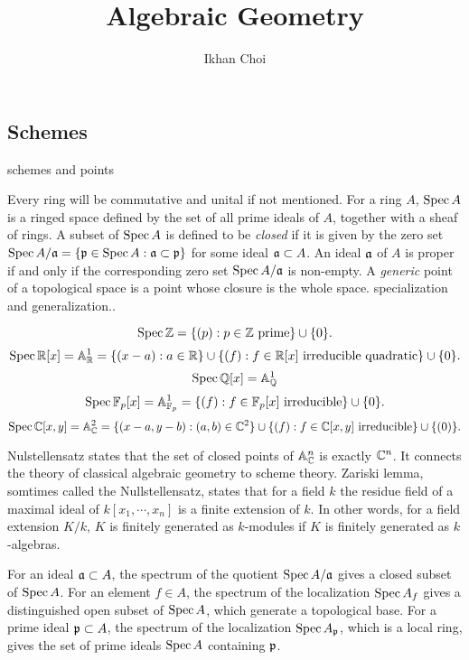 \documentclass{../../large}
\begin{document}
\title{Algebraic Geometry}
\author{Ikhan Choi}
\maketitle
\tableofcontents

\part{}


\chapter{Schemes}

\begin{prb}
schemes and points
\end{prb}
Every ring will be commutative and unital if not mentioned.
For a ring $A$, $\operatorname{Spec} A$ is a ringed space defined by the set of all prime ideals of $A$, together with a sheaf of rings.
A subset of $\operatorname{Spec} A$ is defined to be \emph{closed} if it is given by the zero set $\operatorname{Spec} A/\mathfrak{a}=\{\mathfrak{p}\in\operatorname{Spec} A:\mathfrak{a}\subset\mathfrak{p}\}$ for some ideal $\mathfrak{a}\subset A$.
An ideal $\mathfrak{a}$ of $A$ is proper if and only if the corresponding zero set $\operatorname{Spec} A/\mathfrak{a}$ is non-empty.
A \emph{generic} point of a topological space is a point whose closure is the whole space.
specialization and generalization..

\[\operatorname{Spec}\mathbb{Z}=\{(p):p\in\mathbb{Z}\text{ prime}\}\cup\{0\}.\]
\[\operatorname{Spec}\mathbb{R}[x]=\mathbb{A}^1_{\mathbb{R}}=\{(x-a):a\in\mathbb{R}\}\cup\{(f):f\in\mathbb{R}[x]\text{ irreducible quadratic}\}\cup\{0\}.\]
\[\operatorname{Spec}\mathbb{Q}[x]=\mathbb{A}^1_{\mathbb{Q}}\]
\[\operatorname{Spec}\mathbb{F}_p[x]=\mathbb{A}^1_{\mathbb{F}_p}=\{(f):f\in\mathbb{F}_p[x]\text{ irreducible}\}\cup\{0\}.\]
\[\operatorname{Spec}\mathbb{C}[x,y]=\mathbb{A}^2_{\mathbb{C}}=\{(x-a,y-b):(a,b)\in\mathbb{C}^2\}\cup\{(f):f\in\mathbb{C}[x,y]\text{ irreducible}\}\cup\{(0)\}.\]

Nulstellensatz states that the set of closed points of $\mathbb{A}^n_{\mathbb{C}}$ is exactly $\mathbb{C}^n$.
It connects the theory of classical algebraic geometry to scheme theory.
Zariski lemma, somtimes called the Nullstellensatz, states that for a field $k$ the residue field of a maximal ideal of $k[x_1,\cdots,x_n]$ is a finite extension of $k$.
In other words, for a field extension $K/k$, $K$ is finitely generated as $k$-modules if $K$ is finitely generated as $k$-algebras.


\begin{prb}
\end{prb}

For an ideal $\mathfrak{a}\subset A$, the spectrum of the quotient $\operatorname{Spec} A/\mathfrak{a}$ gives a closed subset of $\operatorname{Spec} A$.
For an element $f\in A$, the spectrum of the localization $\operatorname{Spec} A_f$ gives a distinguished open subset of $\operatorname{Spec} A$, which generate a topological base.
For a prime ideal $\mathfrak{p}\subset A$, the spectrum of the localization $\operatorname{Spec} A_{\mathfrak{p}}$, which is a local ring, gives the set of prime ideals $\operatorname{Spec} A$ containing $\mathfrak{p}$.
\end{document}
